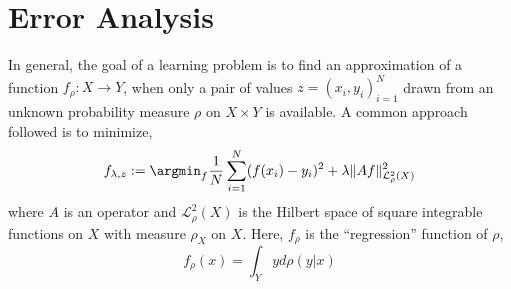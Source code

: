 \section{Error Analysis}
\label{error_analysis}

In general, the goal of a learning problem is to find an approximation of a function $f_\rho : X \to Y$, when only a pair of values $z = (x_i, y_i)_{i=1}^N$ drawn from an unknown probability measure $\rho$ on $X \times Y$ is available. A common approach followed is to minimize,
\[
f_{\lambda,z} := \argmin_f \frac{1}{N}\sum_{i=1}^N (f(x_i) - y_i)^2 + \lambda \|A f \|^2_{\mathcal{L}_{\rho}^2(X)}
\]
where $A$ is an operator and $\mathcal{L}^2_{\rho}(X)$ is the Hilbert space of square integrable functions on $X$ with measure $\rho_X$ on $X$. Here, $f_\rho$ is the ``regression'' function of $\rho$,
\begin{equation}
f_\rho(x) = \int_Y y d\rho(y|x)
\label{eq:f_rho}
\end{equation}

